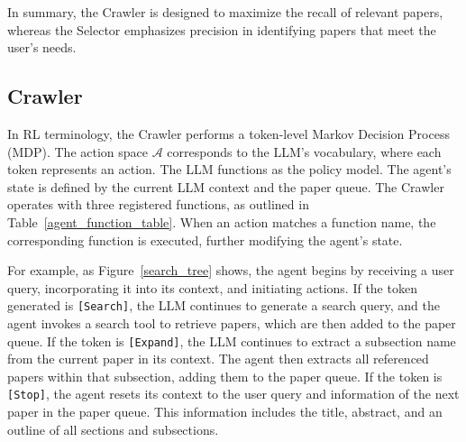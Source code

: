 In summary, the Crawler is designed to maximize the recall of relevant papers, whereas the Selector emphasizes precision in identifying papers that meet the user's needs.

\begin{table}[ht]

\centering
{}
\caption{Functions of the Crawler.}
\label{agent_function_table}
\vspace{-15pt}
\end{table}

\subsection{Crawler}

In RL terminology, the Crawler performs a token-level Markov Decision Process (MDP). The action space $\mathcal{A}$ corresponds to the LLM's vocabulary, where each token represents an action. The LLM functions as the policy model. The agent's state is defined by the current LLM context and the paper queue. The Crawler operates with three registered functions, as outlined in Table~\ref{agent_function_table}. When an action matches a function name, the corresponding function is executed, further modifying the agent's state.

For example, as Figure~\ref{search_tree} shows, the agent begins by receiving a user query, incorporating it into its context, and initiating actions. If the token generated is \texttt{[Search]}, the LLM continues to generate a search query, and the agent invokes a search tool to retrieve papers, which are then added to the paper queue. If the token is \texttt{[Expand]}, the LLM continues to extract a subsection name from the current paper in its context. The agent then extracts all referenced papers within that subsection, adding them to the paper queue. If the token is \texttt{[Stop]}, the agent resets its context to the user query and information of the next paper in the paper queue. This information includes the title, abstract, and an outline of all sections and subsections.

